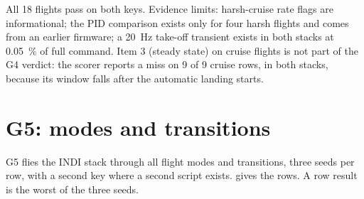 \begin{keyresult}
All 18 flights pass on both keys.
Evidence limits: harsh-cruise rate flags are informational; the PID comparison exists only for four harsh flights and comes from an earlier firmware; a 20~Hz take-off transient exists in both stacks at 0.05~\% of full command.
Item 3 (steady state) on cruise flights is not part of the G4 verdict: the scorer reports a miss on 9 of 9 cruise rows, in both stacks, because its window falls after the automatic landing starts.
\end{keyresult}

\section{G5: modes and transitions}\label{sec:val_g5}

G5 flies the INDI stack through all flight modes and transitions, three seeds per row, with a second key where a second script exists.
 gives the rows.
A row result is the worst of the three seeds.

